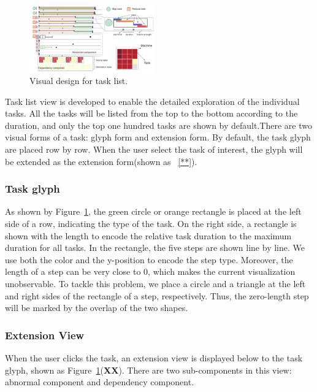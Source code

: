\begin{figure}[t]
	\centering
	\includegraphics[width=0.48\textwidth]{figures/visualization/taskList.pdf}
	\vspace{-3mm}
	\caption{Visual design for task list.}
	\label{fig:taskList}
	\vspace{-3mm}
\end{figure}

Task list view is developed to enable the detailed exploration of the individual tasks.
All the tasks will be listed from the top to the bottom according to the duration, and only the top one hundred tasks are shown by default.There are two visual forms of a task: glyph form and extension form. By default, the task glyph are placed row by row. When the user select the task of interest, the glyph will be extended as the extension form(shown as ~\ref{**}).


\subsubsection{Task glyph}
As shown by Figure~\ref{fig:taskList}, the green circle or orange rectangle is placed at the left side of a row, indicating the type of the task. On the right side, a rectangle is shown with the length to encode the relative task duration to the maximum duration for all tasks. In the rectangle, the five steps are shown line by line. We use both the color and the y-position to encode the step type. Moreover, the length of a step can be very close to 0, which makes the current visualization unobservable. To tackle this problem, we place a circle and a triangle at the left and right sides of the rectangle of a step, respectively. Thus, the zero-length step will be marked by the overlap of the two shapes.

\subsubsection{Extension View}
When the user clicks the task, an extension view is displayed below to the task glyph, shown as Figure~\ref{fig:taskList}(\textbf{XX}). There are two sub-components in this view: abnormal component and dependency component. 


